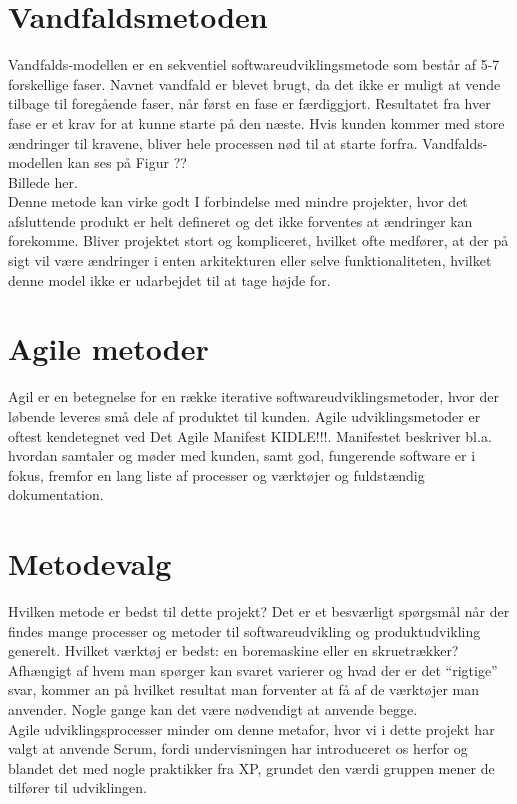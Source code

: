 \section{Vandfaldsmetoden}\label{sec:vandfald}
Vandfalds-modellen er en sekventiel softwareudviklingsmetode som består af 5-7 forskellige faser. 
Navnet vandfald er blevet brugt, da det ikke er muligt at vende tilbage til foregående faser, 
når først en fase er færdiggjort. Resultatet fra hver fase er et krav for at kunne starte på den næste. 
Hvis kunden kommer med store ændringer til kravene, bliver hele processen nød til at starte forfra.  
Vandfalds-modellen kan ses på Figur ?? \\

Billede her. \\

Denne metode kan virke godt I forbindelse med mindre projekter, hvor det afsluttende produkt er 
helt defineret og det ikke forventes at ændringer kan forekomme. Bliver projektet stort og kompliceret,
hvilket ofte medfører, at der på sigt vil være ændringer i enten arkitekturen eller selve funktionaliteten, 
hvilket denne model ikke er udarbejdet til at tage højde for.

\section{Agile metoder}\label{sec:agilemetoder}
Agil er en betegnelse for en række iterative softwareudviklingsmetoder, hvor der løbende leveres små dele af 
produktet til kunden. Agile udviklingsmetoder er oftest kendetegnet ved Det Agile Manifest KIDLE!!!.
Manifestet beskriver bl.a. hvordan samtaler og møder med kunden, samt god, fungerende software er i fokus, 
fremfor en lang liste af processer og værktøjer og fuldstændig dokumentation.

\section{Metodevalg}\label{sec:valgafprocesmodel}
Hvilken metode er bedst til dette projekt? Det er et besværligt spørgsmål når der findes mange processer 
og metoder til softwareudvikling og produktudvikling generelt. Hvilket værktøj er bedst: en boremaskine 
eller en skruetrækker? Afhængigt af hvem man spørger kan svaret varierer og hvad der er det “rigtige” svar, 
kommer an på hvilket resultat man forventer at få af de værktøjer man anvender. Nogle gange kan det være nødvendigt at anvende begge. \\

Agile udviklingsprocesser minder om denne metafor, hvor vi i dette projekt har valgt at anvende Scrum, 
fordi undervisningen har introduceret os herfor og blandet det med nogle praktikker fra XP, grundet den værdi gruppen mener de tilfører til udviklingen.